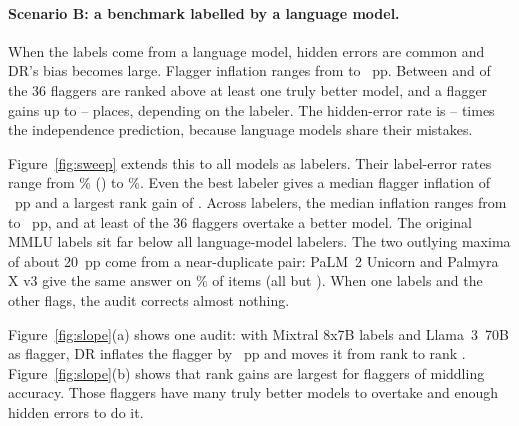 \begin{table}[t]
\centering
\scriptsize

\caption{Scenario A (original MMLU labels, \nLabelErrA{} label errors among \nItems{} items): DR audits with the six most accurate models as single flaggers, and with union panels of the top 3, 5, 10 and all models. ``Inflation'' is the flagger's DR bias; for panels it is the largest bias among panel members, which equals $\Pn(J_G)$ (Proposition~\ref{prop:panel}). ``Inversions'' counts model pairs whose order DR reverses. Online Appendix Table~OA.1 lists all \nModels{} flaggers.}
\label{tab:flaggersA}
\end{table}

\paragraph{Scenario B: a benchmark labelled by a language model.} When the labels come from a language model, hidden errors are common and DR's bias becomes large. Flagger inflation ranges from \inflMinB{} to \inflMaxB{}~pp. Between \favFlaggersBmin{} and \favFlaggersBmax{} of the 36 flaggers are ranked above at least one truly better model, and a flagger gains up to \rankGainBmin--\rankGainBmax{} places, depending on the labeler. The hidden-error rate is \indepRatioBmin--\indepRatioBmax{} times the independence prediction, because language models share their mistakes.

Figure~\ref{fig:sweep} extends this to all \sweepN{} models as labelers. Their label-error rates range from \sweepErrMin\% (\sweepBestLabeler) to \sweepErrMax\%. Even the best labeler gives a median flagger inflation of \sweepBestMedInfl~pp and a largest rank gain of \sweepBestMaxGain. Across labelers, the median inflation ranges from \sweepMedInflMin{} to \sweepMedInflMax~pp, and at least \sweepFavMin{} of the 36 flaggers overtake a better model. The original MMLU labels sit far below all language-model labelers. The two outlying maxima of about 20~pp come from a near-duplicate pair: PaLM~2 Unicorn and Palmyra X v3 give the same answer on \dupAgree\% of items (all but \dupDiffer). When one labels and the other flags, the audit corrects almost nothing.

Figure~\ref{fig:slope}(a) shows one audit: with Mixtral 8x7B labels and Llama~3~70B as flagger, DR inflates the flagger by \llamaInflB~pp and moves it from rank \llamaTrueRankB{} to rank \llamaDrRankB. Figure~\ref{fig:slope}(b) shows that rank gains are largest for flaggers of middling accuracy. Those flaggers have many truly better models to overtake and enough hidden errors to do it.

